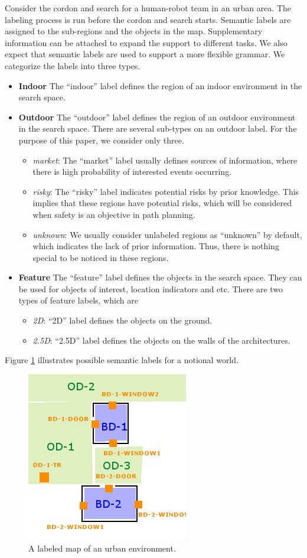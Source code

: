 Consider the cordon and search for a human-robot team in an urban area.
The labeling process is run before the cordon and search starts. 
Semantic labels are assigned to the sub-regions and the objects in the map.
Supplementary information can be attached to expand the support to different tasks.
We also expect that semantic labels are used to support a more flexible grammar.
We categorize the labels into three types.
\begin{itemize} 
\item \textbf{Indoor} 
The ``indoor'' label defines the region of an indoor environment in the search space.
\item \textbf{Outdoor} 
The ``outdoor'' label defines the region of an outdoor environment in the search space.
There are several sub-types on an outdoor label.
For the purpose of this paper, we consider only three.
\begin{itemize} 
\item \emph{market}: 
The ``market'' label usually defines sources of information, where there is high probability of interested events occurring.
\item \emph{risky}: 
The ``risky'' label indicates potential risks by prior knowledge. 
This implies that these regions have potential risks, which will be considered when safety is an objective in path planning.
\item \emph{unknown}: 
We usually consider unlabeled regions as ``unknown'' by default, which indicates the lack of prior information.
Thus, there is nothing special to be noticed in these regions.
\end{itemize}
\item \textbf{Feature} 
The ``feature'' label defines the objects in the search space.
They can be used for objects of interest, location indicators and etc.
There are two types of feature labels, which are
\begin{itemize} 
\item \emph{2D}: ``2D'' label defines the objects on the ground.
\item \emph{2.5D}: ``2.5D'' label defines the objects on the walls of the architectures.
\end{itemize}
\end{itemize}

Figure \ref{fig:Label} illustrates possible semantic labels for a notional world.

\begin{figure}[tbph]
\centering
\includegraphics[width=0.4\linewidth]{./images/newLabel-text}
\caption{A labeled map of an urban environment.}
\label{fig:Label}
\end{figure}

